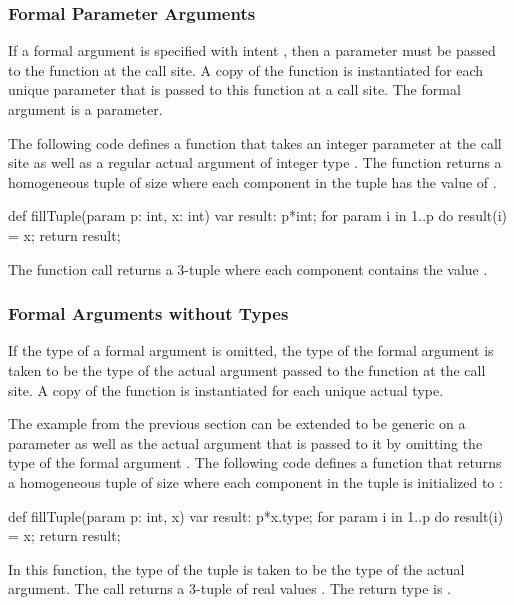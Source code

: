 \subsubsection{Formal Parameter Arguments}
\label{Formal_Parameter_Arguments}

If a formal argument is specified with intent , then a
parameter must be passed to the function at the call site.  A copy of
the function is instantiated for each unique parameter that is passed
to this function at a call site.  The formal argument is a parameter.
\begin{example}
The following code defines a function that takes an integer parameter
 at the call site as well as a regular actual argument of
integer type .  The function returns a homogeneous tuple of
size  where each component in the tuple has the value of
.
\begin{chapel}
def fillTuple(param p: int, x: int) {
  var result: p*int;
  for param i in 1..p do
    result(i) = x;
  return result;
}
\end{chapel}
The function call  returns a 3-tuple where each
component contains the value .
\end{example}

\subsubsection{Formal Arguments without Types}
\label{Formal_Arguments_without_Types}

If the type of a formal argument is omitted, the type of the formal
argument is taken to be the type of the actual argument passed to the
function at the call site.  A copy of the function is instantiated for
each unique actual type.
\begin{example}
The example from the previous section can be extended to be generic on
a parameter as well as the actual argument that is passed to it by
omitting the type of the formal argument .  The following code
defines a function that returns a homogeneous tuple of size 
where each component in the tuple is initialized to :
\begin{chapel}
def fillTuple(param p: int, x) {
  var result: p*x.type;
  for param i in 1..p do
    result(i) = x;
  return result;
}
\end{chapel}
In this function, the type of the tuple is taken to be the type of the
actual argument.  The call  returns a 3-tuple
of real values .  The return type is
.
\end{example}

